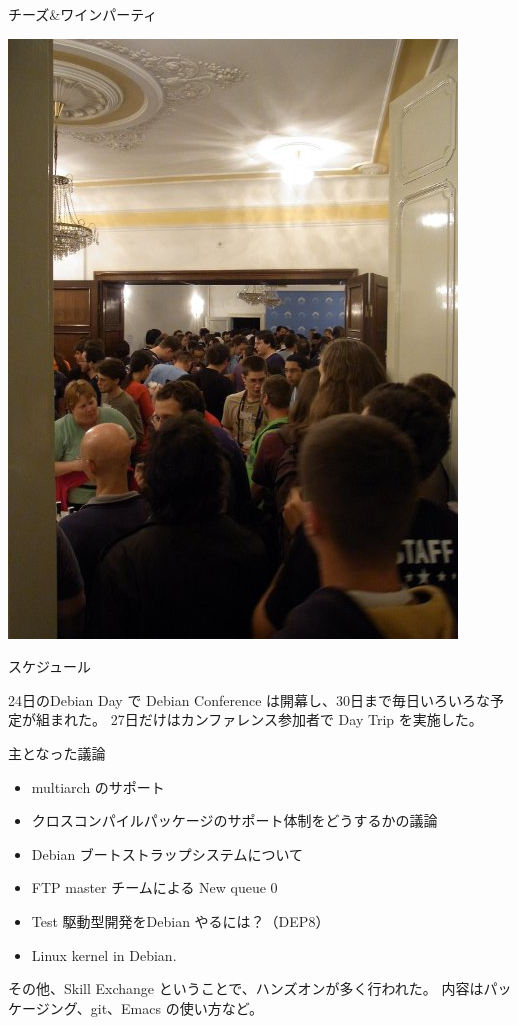 \begin{frame}{チーズ\&ワインパーティ}
\begin{center}
\includegraphics[height=0.9\hsize]{image201108/debconf11_cw.jpg}
\end{center}
\end{frame}



\begin{frame}{スケジュール}

24日のDebian Day で Debian Conference は開幕し、30日まで毎日いろいろな予
定が組まれた。
27日だけはカンファレンス参加者で Day Trip を実施した。

\end{frame}

\begin{frame}{主となった議論}

\begin{itemize}
\item multiarch のサポート
\item クロスコンパイルパッケージのサポート体制をどうするかの議論
\item Debian ブートストラップシステムについて
\item FTP master チームによる New queue 0
\item Test 駆動型開発をDebian やるには？（DEP8）
\item Linux kernel in Debian.
\end{itemize}

その他、Skill Exchange ということで、ハンズオンが多く行われた。
内容はパッケージング、git、Emacs の使い方など。

\end{frame}


